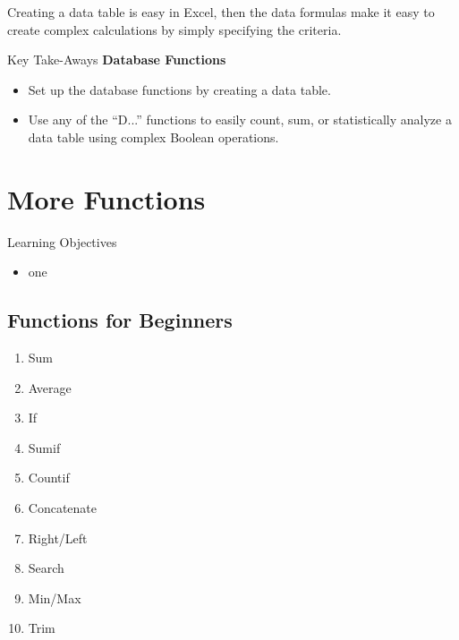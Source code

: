 Creating a data table is easy in Excel, then the data formulas make it easy to create complex calculations by simply specifying the criteria.
	
\begin{center}
	\begin{tkwbox}{Key Take-Aways}
		\textbf{Database Functions}
		\\
		\begin{itemize}
			\setlength{\itemsep}{0pt}
			\setlength{\parskip}{0pt}
			\setlength{\parsep}{0pt}
			
			\item Set up the database functions by creating a data table.
			\item Use any of the ``D...'' functions to easily count, sum, or statistically analyze a data table using complex Boolean operations. 
			
		\end{itemize}
	\end{tkwbox}
\end{center}

\section{More Functions}

\begin{center}
	\begin{objbox}{Learning Objectives}
		\begin{itemize}
			\setlength{\itemsep}{0pt}
			\setlength{\parskip}{0pt}
			\setlength{\parsep}{0pt}
			
			\item one
			
		\end{itemize}
	\end{objbox}
\end{center}

\subsection{Functions for Beginners}

\begin{enumerate}
	\item Sum
	\item Average
	\item If
	\item Sumif
	\item Countif
	\item Concatenate
	\item Right/Left
	\item Search
	\item Min/Max
	\item Trim
\end{enumerate}

